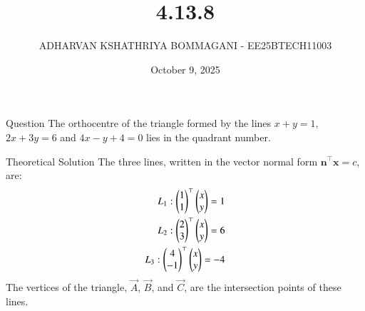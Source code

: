 \documentclass{beamer}
\title{4.13.8}
\date{October 9, 2025}
\author{ADHARVAN KSHATHRIYA BOMMAGANI - EE25BTECH11003}
\begin{document}
\frame{\titlepage}

\begin{frame}{Question}
The orthocentre of the triangle formed by the lines $x + y = 1$, $2x + 3y = 6$ and $4x - y + 4 = 0$ lies in the quadrant number.
\end{frame}

\begin{frame}{Theoretical Solution}
The three lines, written in the vector normal form $\mathbf{n}^\top \mathbf{x} = c$, are:
\begin{align}
     L_1: \begin{pmatrix}1 \\ 1\end{pmatrix}^\top \begin{pmatrix}x \\ y\end{pmatrix} = 1\\
     L_2: \begin{pmatrix}2 \\ 3\end{pmatrix}^\top \begin{pmatrix}x \\ y\end{pmatrix} = 6\\
     L_3: \begin{pmatrix}4 \\ -1\end{pmatrix}^\top \begin{pmatrix}x \\ y\end{pmatrix} = -4
     \end{align}
\bigskip
The vertices of the triangle, $\vec{A}$, $\vec{B}$, and $\vec{C}$, are the intersection points of these lines.
\end{frame}
\end{document}
